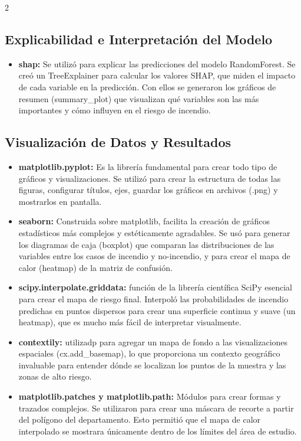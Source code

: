 \documentclass[a4paper,10pt]{article}
\begin{document}
\begin{multicols}{2}
\subsection{Explicabilidad e Interpretación del Modelo}
\begin{itemize}
    \item \textbf{shap:} Se utilizó para explicar las predicciones del modelo RandomForest. Se creó un TreeExplainer para calcular los valores SHAP, que miden el impacto de cada variable en la predicción. Con ellos se generaron los gráficos de resumen (summary\_plot) que visualizan qué variables son las más importantes y cómo influyen en el riesgo de incendio.
\end{itemize}
\subsection{Visualización de Datos y Resultados}
\begin{itemize}
    \item \textbf{matplotlib.pyplot:} Es la librería fundamental para crear todo tipo de gráficos y visualizaciones. Se utilizó para crear la estructura de todas las figuras, configurar títulos, ejes, guardar los gráficos en archivos (.png) y mostrarlos en pantalla.
    \item \textbf{seaborn:} Construida sobre matplotlib, facilita la creación de gráficos estadísticos más complejos y estéticamente agradables. Se usó para generar los diagramas de caja (boxplot) que comparan las distribuciones de las variables entre los casos de incendio y no-incendio, y para crear el mapa de calor (heatmap) de la matriz de confusión.
    \item \textbf{scipy.interpolate.griddata:}  función de la librería científica SciPy esencial para crear el mapa de riesgo final. Interpoló las probabilidades de incendio predichas en puntos dispersos para crear una superficie continua y suave (un heatmap), que es mucho más fácil de interpretar visualmente.
    \item \textbf{contextily:} utilizadp para agregar un mapa de fondo a las visualizaciones espaciales (cx.add\_basemap), lo que proporciona un contexto geográfico invaluable para entender dónde se localizan los puntos de la muestra y las zonas de alto riesgo.
    \item \textbf{matplotlib.patches y matplotlib.path:}  Módulos para crear formas y trazados complejos. Se utilizaron para crear una máscara de recorte a partir del polígono del departamento. Esto permitió que el mapa de calor interpolado se mostrara únicamente dentro de los límites del área de estudio.
\end{itemize}

\end{multicols}
\end{document}
